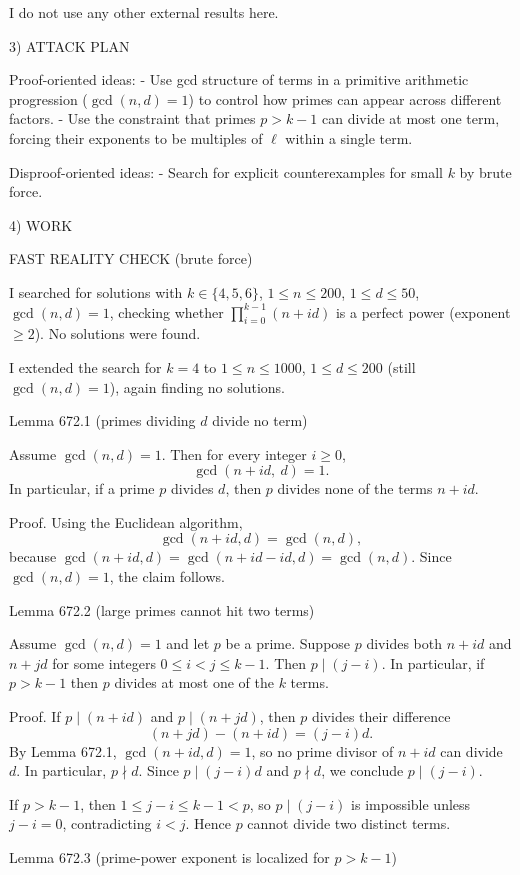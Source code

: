 I do not use any other external results here.

3) ATTACK PLAN

Proof-oriented ideas:
- Use gcd structure of terms in a primitive arithmetic progression ($\gcd(n,d)=1$) to control how primes can appear across different factors.
- Use the constraint that primes $p>k-1$ can divide at most one term, forcing their exponents to be multiples of $\ell$ within a single term.

Disproof-oriented ideas:
- Search for explicit counterexamples for small $k$ by brute force.

4) WORK

FAST REALITY CHECK (brute force)

I searched for solutions with $k\in\{4,5,6\}$, $1\le n\le 200$, $1\le d\le 50$, $\gcd(n,d)=1$, checking whether $\prod_{i=0}^{k-1}(n+id)$ is a perfect power (exponent $\ge2$). No solutions were found.

I extended the search for $k=4$ to $1\le n\le 1000$, $1\le d\le 200$ (still $\gcd(n,d)=1$), again finding no solutions.

Lemma 672.1 (primes dividing $d$ divide no term)

Assume $\gcd(n,d)=1$. Then for every integer $i\ge 0$,
\[
\gcd(n+id,\ d)=1.
\]
In particular, if a prime $p$ divides $d$, then $p$ divides none of the terms $n+id$.

Proof.
Using the Euclidean algorithm,
\[
\gcd(n+id,d)=\gcd(n,d),
\]
because $\gcd(n+id,d)=\gcd(n+id-id,d)=\gcd(n,d)$. Since $\gcd(n,d)=1$, the claim follows.


Lemma 672.2 (large primes cannot hit two terms)

Assume $\gcd(n,d)=1$ and let $p$ be a prime. Suppose $p$ divides both $n+id$ and $n+jd$ for some integers $0\le i<j\le k-1$. Then $p\mid (j-i)$. In particular, if $p>k-1$ then $p$ divides at most one of the $k$ terms.

Proof.
If $p\mid(n+id)$ and $p\mid(n+jd)$, then $p$ divides their difference
\[
(n+jd)-(n+id)=(j-i)d.
\]
By Lemma 672.1, $\gcd(n+id,d)=1$, so no prime divisor of $n+id$ can divide $d$. In particular, $p\nmid d$. Since $p\mid (j-i)d$ and $p\nmid d$, we conclude $p\mid (j-i)$.

If $p>k-1$, then $1\le j-i\le k-1<p$, so $p\mid (j-i)$ is impossible unless $j-i=0$, contradicting $i<j$. Hence $p$ cannot divide two distinct terms.


Lemma 672.3 (prime-power exponent is localized for $p>k-1$)

